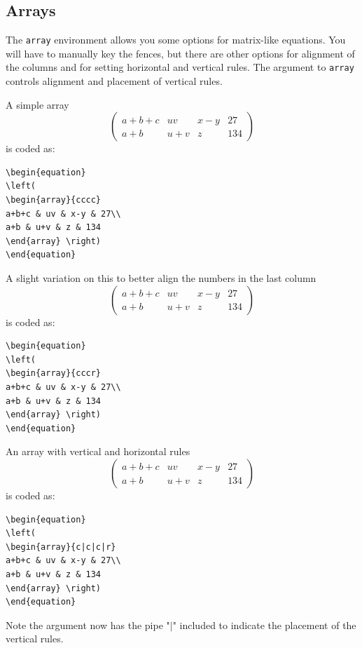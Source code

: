 \subsection{Arrays}
The {\tt{array}} environment allows you some options for matrix-like equations. You will have to manually key the fences, but there are other options for alignment of the columns and for setting horizontal and vertical rules. The argument to {\tt{array}} controls alignment and placement of vertical rules.

A simple array
\begin{equation}
\left(
\begin{array}{cccc}
a+b+c & uv & x-y & 27\\
a+b & u+v & z & 134
\end{array}\right)
\end{equation}
is coded as:
\begin{verbatim}
\begin{equation}
\left(
\begin{array}{cccc}
a+b+c & uv & x-y & 27\\
a+b & u+v & z & 134
\end{array} \right)
\end{equation}
\end{verbatim}

A slight variation on this to better align the numbers in the last column
\begin{equation}
\left(
\begin{array}{cccr}
a+b+c & uv & x-y & 27\\
a+b & u+v & z & 134
\end{array}\right)
\end{equation}
is coded as:
\begin{verbatim}
\begin{equation}
\left(
\begin{array}{cccr}
a+b+c & uv & x-y & 27\\
a+b & u+v & z & 134
\end{array} \right)
\end{equation}
\end{verbatim}

An array with vertical and horizontal rules
\begin{equation}
\left( \begin{array}{c|c|c|r}
a+b+c & uv & x-y & 27\\ \hline
a+b & u+v & z & 134
\end{array}\right)
\end{equation}
is coded as:
\begin{verbatim}
\begin{equation}
\left(
\begin{array}{c|c|c|r}
a+b+c & uv & x-y & 27\\
a+b & u+v & z & 134
\end{array} \right)
\end{equation}
\end{verbatim}
Note the argument now has the pipe "$\vert$" included to indicate the placement of the vertical rules.


